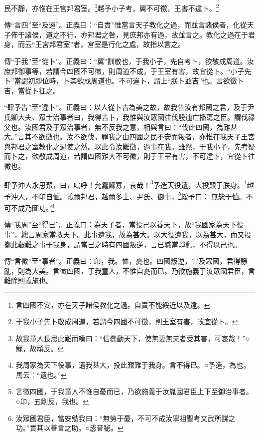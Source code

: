 民不靜，亦惟在王宮邦君室。\footnote{言四國不安，亦在天子諸侯教化之過。自責不能綏近以及遠。}越予小子考，翼不可徵，王害不違卜。\footnote{于我小子先卜敬成周道，若謂今四國不可徵，則王室有害，故宜從卜。}

{\noindent\zhuan{}\fzbyks 傳“言四”至“及遠”。正義曰：“自責”惟當言天子教化之過，而並言諸侯者，化從天子佈于諸侯，道之不行，亦邦君之咎，見庶邦亦有過，故並言之。教化之過在于君身，而云“王宮邦君室”者，宮室是行化之處，故指以言之。 \par}

{\noindent\zhuan{}\fzbyks 傳“于我”至“從卜”。正義曰：“翼”訓敬也，于我小子，先自考卜，欲敬成周道。汝庶邦御事等，若謂今四國不可徵，則周道不成，于王室有害，故宜從卜。“小子先卜”當謂初即位時，卜其欲成周道也。不可違卜，謂上“朕卜並吉”也。言欲徵卜吉，當從卜征之。 \par}

{\noindent\shu{}\fzkt “肆予告”至“違卜”。正義曰：以人從卜吉為美之故，故我告汝有邦國之君，及于尹氏卿大夫、眾士治事者曰，我得吉卜，我惟與汝眾國往伐殷逋亡播蕩之臣。謂伐祿父也。汝國君及于眾治事者，無不反我之意，相與言曰：“伐此四國，為難甚大。”言其不欲徵也。汝不欲伐，罪我之由四國之民不安而叛者，亦惟在我天子王宮與邦君之室教化之過使之然。以此令汝難徵，過事在我。雖然，于我小子，先考疑而卜之，欲敬成周道，若謂四國難大不可徵，則于王室有害，不可違卜，宜從卜往徵也。 \par}

肆予沖人永思艱，曰，嗚呼！允蠢鰥寡，哀哉！\footnote{故我童人長思此難而嘆曰：“信蠢動天下，使無妻無夫者受其害，可哀哉！”○鰥，故頑反。}予造天役遺，大投艱于朕身。\footnote{我周家為天下役事，遺我甚大，投此艱難于我身。言不得已。○予造，為也。馬云：“遺也。”}越予沖人，不卬自恤。義爾邦君，越爾多士、尹氏、御事，\footnote{言徵四國，于我童人不惟自憂而已，乃欲施義于汝胤國君臣上下至御治事者。○卬，五剛反，我也。}綏予曰：‘無毖于恤。不可不成乃圖功。’\footnote{汝眾國君臣，當安勉我曰：“無勞于憂，不可不成汝寧祖聖考文武所謀之功。”責其以善言之助。○毖音秘。}


{\noindent\zhuan{}\fzbyks 傳“我周”至“得已”。正義曰：為天子者，當役己以養天下，故“我國家為天下役事”，總言周家當救天下。此事遺我，故為甚大。以大役遺我，以為甚大，而又投擲此艱難之事于我身，謂當已之時有四國叛逆，言已職當靜亂，不得以己也。 \par}

{\noindent\zhuan{}\fzbyks 傳“言徵”至“事者”。正義曰：卬，我。恤，憂也。四國叛逆，害及眾國，君得靜亂，則為大美。言徵四國，于我童人，不惟自憂而已。乃欲施義于汝眾國君臣，言難除則義施也。 \par}


